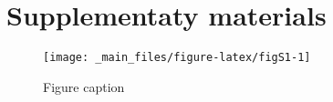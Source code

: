 \documentclass[
  12pt,
]{article}
\begin{document}
\pagebreak

\hypertarget{supplementaty-materials}{%
\section*{Supplementaty materials}\label{supplementaty-materials}}

\renewcommand{\thefigure}{S\arabic{figure}}
\setcounter{figure}{0}
\renewcommand{\thetable}{S\arabic{table}}
\setcounter{table}{0}
\renewcommand{\theequation}{S\arabic{equation}}
\setcounter{equation}{0}

\begin{figure}[H]
\texttt{[image: \_main\_files/figure-latex/figS1-1]} \caption{Figure caption}\label{fig:figS1}
\end{figure}
\end{document}
